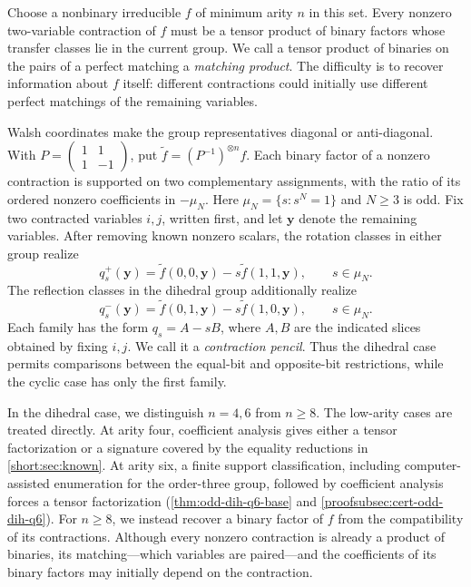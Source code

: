\documentclass[11pt,letterpaper,onecolumn]{article}
\theoremstyle{plain}
\theoremstyle{definition}
\theoremstyle{remark}
\begin{document}
Choose a nonbinary irreducible \(f\) of minimum arity \(n\) in this
set. Every nonzero two-variable contraction of \(f\) must be a tensor
product of binary factors whose transfer classes lie in the current
group. We call a tensor product of binaries on the pairs of a perfect
matching a \emph{matching product}. The difficulty is to recover information about \(f\) itself:
different contractions could initially use different perfect matchings
of the remaining variables.

Walsh coordinates make the group representatives diagonal or
anti-diagonal. With
\(P=\left(\begin{smallmatrix}1&1\\1&-1\end{smallmatrix}\right)\), put
\(\widetilde f=(P^{-1})^{\otimes n}f\). Each binary factor of a
nonzero contraction is supported on two complementary assignments, with
the ratio of its ordered nonzero coefficients in \(-\mu_N\).
Here \(\mu_N=\{s:s^N=1\}\) and \(N\ge3\) is odd.
Fix two contracted variables \(i,j\), written first, and let
\(\mathbf y\) denote the remaining variables. After removing known
nonzero scalars, the rotation classes in either group realize
\[
q_s^+(\mathbf y)=\widetilde f(0,0,\mathbf y)
-s\widetilde f(1,1,\mathbf y),\qquad s\in\mu_N.
\]
The reflection classes in the dihedral group additionally realize
\[
q_s^-(\mathbf y)=\widetilde f(0,1,\mathbf y)
-s\widetilde f(1,0,\mathbf y),\qquad s\in\mu_N.
\]
Each family has the form \(q_s=A-sB\), where \(A,B\) are the indicated
slices obtained by fixing \(i,j\). We call it a \emph{contraction pencil}.
Thus the dihedral case permits comparisons between the equal-bit and
opposite-bit restrictions, while the cyclic case has only the first family.

In the dihedral case, we distinguish \(n=4,6\) from \(n\ge8\).
The low-arity cases are treated directly. At arity four, coefficient
analysis gives either a tensor factorization or a signature covered by
the equality reductions in \cref{short:sec:known}. At arity six, a finite
support classification, including computer-assisted enumeration for the
order-three group, followed by coefficient analysis forces a tensor
factorization (\cref{thm:odd-dih-q6-base} and
\cref{proofsubsec:cert-odd-dih-q6}). For \(n\ge8\), we instead recover
a binary factor of \(f\) from the compatibility of its contractions.
Although every nonzero contraction is already a product of binaries,
its matching---which variables are paired---and the coefficients of its
binary factors may initially depend on the contraction.
\end{document}
